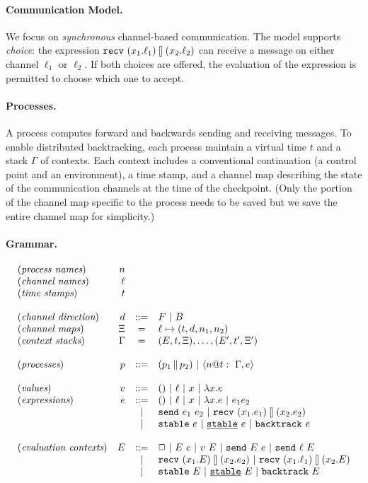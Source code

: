 \documentclass{article}
\begin{document}
\paragraph*{Communication Model.} We focus on \emph{synchronous}
channel-based communication. The model supports \emph{choice}: the expression
$\recv{x_1}{\ell_1}{x_2}{\ell_2}$ can receive a message on either channel
$\ell_1$ or $\ell_2$. If both choices are offered, the evaluation of the
expression is permitted to choose which one to accept. 

\paragraph*{Processes.} A process computes forward and backwards sending and
receiving messages. To enable distributed backtracking, each process maintain
a virtual time $t$ and a stack $\Gamma$ of contexts. Each context includes a
conventional continuation (a control point and an environment), a time stamp,
and a channel map describing the state of the communication channels at the
time of the checkpoint. (Only the portion of the channel map specific to the
process needs to be saved but we save the entire channel map for simplicity.)

\paragraph*{Grammar.}

\[\begin{array}{lrcl}
(\textit{process names}) & n \\
(\textit{channel names}) & \ell \\
(\textit{time stamps}) & t \\
\\
(\textit{channel direction}) & d &::=& F \alt B \\
(\textit{channel maps}) & \Xi &=& \ell \mapsto (t,d,n_1,n_2) \\
(\textit{context stacks}) & \Gamma &=& (E,t,\Xi),\ldots,(E',t',\Xi') \\
\\
(\textit{processes}) & p &::=& (\parc{p_1}{p_2}) \alt \proc{n}{\Gamma}{e}{t} \\
\\
(\textit{values}) & v &::=& () \alt \ell \alt x \alt \lambda x.e \\
(\textit{expressions}) & e &::=& () \alt \ell \alt x \alt \lambda x.e 
  \alt e_1e_2 \\
  &&\alt& \send{e_1}{e_2} \alt \recv{x_1}{e_1}{x_2}{e_2} \\
  &&\alt& \stable{e} \alt \stableu{e} \alt \backtrack{e} \\
\\
(\textit{evaluation contexts}) & E &::=& \Box \alt E~e \alt v~E \alt 
  \send{E}{e} \alt \send{\ell}{E} \\
  &&\alt& \recv{x_1}{E}{x_2}{e_2} \alt \recv{x_1}{\ell_1}{x_2}{E} \\
  &&\alt& \stable{E} \alt \stableu{E} \alt \backtrack{E}
\end{array}\]
\end{document}
